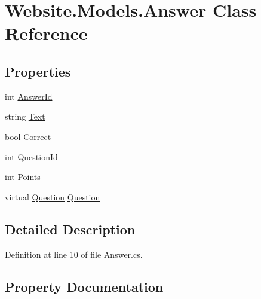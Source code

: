\hypertarget{class_website_1_1_models_1_1_answer}{}\section{Website.\+Models.\+Answer Class Reference}
\label{class_website_1_1_models_1_1_answer}
\subsection*{Properties}
\begin{DoxyCompactItemize}
\item 
int \hyperlink{class_website_1_1_models_1_1_answer_a657d28cbd234fb9145a8b680fe267840}{Answer\+Id}
\item 
string \hyperlink{class_website_1_1_models_1_1_answer_a50077dc4ac193258a7eb152726b980d0}{Text}
\item 
bool \hyperlink{class_website_1_1_models_1_1_answer_aab18e853c60a076440554b72d05698aa}{Correct}
\item 
int \hyperlink{class_website_1_1_models_1_1_answer_a15379847af95102a9dc982270eb7b783}{Question\+Id}
\item 
int \hyperlink{class_website_1_1_models_1_1_answer_a10b73d42d29df777f4b004fc4ee9c48a}{Points}
\item 
virtual \hyperlink{class_website_1_1_models_1_1_question}{Question} \hyperlink{class_website_1_1_models_1_1_answer_a985ed3a7b873c20063a9b1e47ddc2c87}{Question}
\end{DoxyCompactItemize}


\subsection{Detailed Description}


Definition at line 10 of file Answer.\+cs.



\subsection{Property Documentation}
\hypertarget{class_website_1_1_models_1_1_answer_a657d28cbd234fb9145a8b680fe267840}{}
